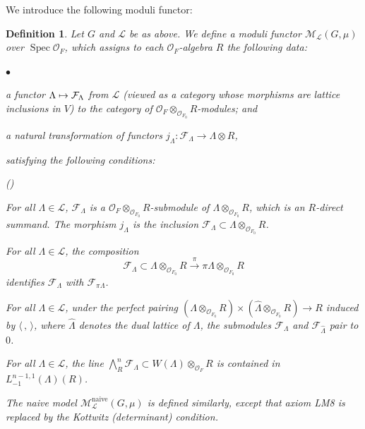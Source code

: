 \documentclass[pdflatex,sn-mathphys-num]{sn-jnl}%
\makeatletter
\theoremstyle{thmstyleone}%
\theoremstyle{thmstyletwo}%
\numberwithin{equation}{subsection}
\theoremstyle{thmstylethree}%
\newtheorem{definition}[subsubsection]{Definition}%
\newcommand{\CF}{\ensuremath{\mathcal{F}}\xspace}
\newcommand{\CL}{\ensuremath{\mathcal{L}}\xspace}
\newcommand{\CM}{\ensuremath{\mathcal{M}}\xspace}
\newcommand{\CO}{\ensuremath{\mathcal{O}}\xspace}
\newcommand{\loc}{\ensuremath{\mathrm{loc}}\xspace}
\newcommand{\naive}{\ensuremath{\mathrm{naive}}\xspace}
\DeclareMathOperator{\Spec}{Spec}
\newcommand{\wh}{\widehat}
\newenvironment{altenumerate}
	{\begin{list}
			{(\theenumi) }
			{\usecounter{enumi}
				\setlength{\labelwidth}{0pt}
				\setlength{\labelsep}{0pt}
				\setlength{\leftmargin}{0pt}
				\setlength{\itemsep}{\the\smallskipamount}
				\renewcommand{\theenumi}{\roman{enumi}}
		}}
		{\end{list}}
\newenvironment{altitemize}
	{\begin{list}
			{$\bullet$}
			{\setlength{\labelwidth}{0pt}
				\setlength{\itemindent}{5pt}
				\setlength{\labelsep}{5pt}
				\setlength{\leftmargin}{0pt}
				\setlength{\itemsep}{\the\smallskipamount}
		}}
		{\end{list}}
\let\shortmapsto\mapsto
\renewcommand{\mapsto}{%
		\ifbool{@display}{\longmapsto}{\shortmapsto}%
	}
\makeatother
\begin{document}
We introduce the following moduli functor: 
\begin{definition}\label{application_nonsplit:defn}
Let $G$ and $\CL$ be as above.
We define a moduli functor $\CM_\CL(G,\mu)$ over $\Spec\CO_F$, which assigns to each $\CO_F$-algebra $R$ the following data:
\begin{altitemize}
	\item a functor $\Lambda\mapsto \CF_\Lambda$ from $\CL$ (viewed as a category whose morphisms are lattice inclusions in $V$) to the category of $\CO_F\otimes_{\CO_{F_0}}R$-modules; and
	\item a natural transformation of functors $j_\Lambda:\CF_\Lambda\rightarrow \Lambda\otimes R$,
\end{altitemize}
satisfying the following conditions:
\begin{altenumerate}
	\item[\fontfamily{cmtt}\selectfont LM1\&2.] For all $\Lambda\in\CL$, $\CF_\Lambda$ is a $\CO_F\otimes_{\CO_{F_0}}R$-submodule of $\Lambda\otimes_{\CO_{F_0}}R$, which is an $R$-direct summand. The morphism $j_\Lambda$ is the inclusion $\CF_\Lambda\subset\Lambda\otimes_{\CO_{F_0}}R$.
	\item[\fontfamily{cmtt}\selectfont LM3.] For all $\Lambda\in\CL$, the composition
	\begin{equation*}
		\CF_\Lambda\subset\Lambda\otimes_{\CO_{F_0}}R\xrightarrow{\pi} \pi\Lambda\otimes_{\CO_{F_0}}R 
	\end{equation*}
	identifies $\CF_\Lambda$ with $\CF_{\pi\Lambda}$.
	\item[\fontfamily{cmtt}\selectfont LM4.] For all $\Lambda\in\CL$, under the perfect pairing $(\Lambda\otimes_{\CO_{F_0}}R)\times(\wh{\Lambda}\otimes_{\CO_{F_0}}R)\rightarrow R$ induced by $\langle\,,\,\rangle$, where $\wh{\Lambda}$ denotes the dual lattice of $\Lambda$, the submodules $\CF_{\Lambda}$ and $\CF_{\wh{\Lambda}}$ pair to $0$.
	\item[\fontfamily{cmtt}\selectfont LM8.] For all $\Lambda\in\CL$, the line $\bigwedge^n_R\CF_\Lambda\subset W(\Lambda)\otimes_{\CO_F}R$ is contained in $L^{n-1,1}_{-1}(\Lambda)(R)$.
\end{altenumerate}

The naive model $\CM_\CL^\naive(G,\mu)$ is defined similarly, except that axiom {\selectfont LM8} is replaced by the Kottwitz (determinant) condition.
\end{definition}
\end{document}
